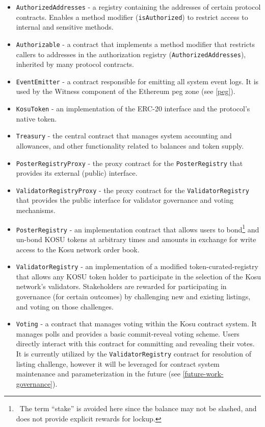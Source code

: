 \documentclass[10pt]{article}
\begin{document}
\begin{itemize}
  \item \texttt{AuthorizedAddresses} - a registry containing the addresses of certain protocol contracts. Enables a method modifier (\texttt{isAuthorized}) to restrict access to internal and sensitive methods.
  \item \texttt{Authorizable} - a contract that implements a method modifier that restricts callers to addresses in the authorization registry (\texttt{AuthorizedAddresses}), inherited by many protocol contracts.
  \item \texttt{EventEmitter} - a contract responsible for emitting all system event logs. It is used by the Witness component of the Ethereum peg zone (see \ref{peg}).
  \item \texttt{KosuToken} - an implementation of the ERC-20 interface and the protocol's native token.
  \item \texttt{Treasury} - the central contract that manages system accounting and allowances, and other functionality related to balances and token supply.
  \item \texttt{PosterRegistryProxy} - the proxy contract for the \texttt{PosterRegistry} that provides its external (public) interface.
  \item \texttt{ValidatorRegistryProxy} - the proxy contract for the \texttt{ValidatorRegistry} that provides the public interface for validator governance and voting mechanisms.
  \item \texttt{PosterRegistry} - an implementation contract that allows users to bond\footnote{\ The term ``stake'' is avoided here since the balance may not be slashed, and does not provide explicit rewards for lockup.} and un-bond KOSU tokens at arbitrary times and amounts in exchange for write access to the Kosu network order book. 
  \item \texttt{ValidatorRegistry} - an implementation of a modified token-curated-registry\cite{tcr-1} that allows any KOSU token holder to participate in the selection of the Kosu network's validators. Stakeholders are rewarded for participating in governance (for certain outcomes) by challenging new and existing listings, and voting on those challenges. 
  \item \texttt{Voting} - a contract that manages voting within the Kosu contract system. It manages polls and provides a basic commit-reveal voting scheme. Users directly interact with this contract for committing and revealing their votes. It is currently utilized by the \texttt{ValidatorRegistry} contract for resolution of listing challenge, however it will be leveraged for contract system maintenance and parameterization in the future (see \ref{future-work-governance}).
\end{itemize}
\end{document}
